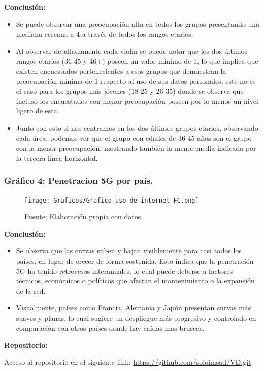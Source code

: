 \documentclass[12pt, a4paper]{article}
\begin{document}
\textbf{Conclusión:}  
\begin{itemize}
    \item Se puede observar una preocupación alta en todos los grupos presentando una mediana cercana a 4 a través de todos los rangos etarios.
    \item Al observar detalladamente cada violín se puede notar que los dos últimos rangos etarios (36-45 y 46+) poseen un valor mínimo de 1, lo que implica que existen encuestados pertenecientes a esos grupos que demuestran la preocupación mínima de 1 respecto al uso de sus datos personales, este no es el caso para los grupos más jóvenes (18-25 y 26-35) donde se observa que incluso los encuestados con menor preocupación poseen por lo menos un nivel ligero de esta.
    \item Junto con esto si nos centramos en los dos últimos grupos etarios, observando cada área, podemos ver que el grupo con edades de 36-45 años son el grupo con la menor preocupación, mostrando también la menor media indicada por la tercera línea horizontal.
\end{itemize}

\subsubsection*{Gráfico 4: Penetracion 5G por país.}
\begin{figure}[H]
    \centering
    \texttt{[image: Graficos/Grafico\_uso\_de\_internet\_FC.png]}
    \caption[6]{Fuente: Elaboración propia con datos}

\end{figure}


\textbf{Conclusión:}  
\begin{itemize}
    \item Se observa que las curvas suben y bajan visiblemente para casi todos los países, en lugar de crecer de forma sostenida. Esto indica que la penetración 5G ha tenido retrocesos interanuales, lo cual puede deberse a factores técnicos, económicos o políticos que afectan el mantenimiento o la expansión de la red.
    \item Visualmente, países como Francia, Alemania y Japón presentan curvas más suaves y planas, lo cual sugiere un despliegue más progresivo y controlado en comparación con otros países donde hay caídas mas bruscas.

\end{itemize}


\textbf{Repositorio:}  
\label{anexo:repositorio}

Acceso al repositorio en el siguiente link: 
\url{https://github.com/soloimsad/VD.git}
\end{document}
